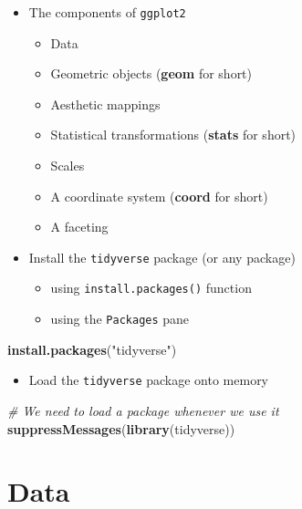 \documentclass[]{book}
\newenvironment{Shaded}{\begin{snugshade}}{\end{snugshade}}
\newcommand{\KeywordTok}[1]{\textcolor[rgb]{0.13,0.29,0.53}{\textbf{{#1}}}}
\newcommand{\StringTok}[1]{\textcolor[rgb]{0.31,0.60,0.02}{{#1}}}
\newcommand{\CommentTok}[1]{\textcolor[rgb]{0.56,0.35,0.01}{\textit{{#1}}}}
\newcommand{\NormalTok}[1]{{#1}}
\providecommand{\tightlist}{%
  \setlength{\itemsep}{0pt}\setlength{\parskip}{0pt}}
\begin{document}
\begin{itemize}
\tightlist
\item
  The components of \texttt{ggplot2}

  \begin{itemize}
  \tightlist
  \item
    Data
  \item
    Geometric objects (\textbf{geom} for short)
  \item
    Aesthetic mappings
  \item
    Statistical transformations (\textbf{stats} for short)
  \item
    Scales
  \item
    A coordinate system (\textbf{coord} for short)
  \item
    A faceting
  \end{itemize}
\item
  Install the \texttt{tidyverse} package (or any package)

  \begin{itemize}
  \tightlist
  \item
    using \texttt{install.packages()} function
  \item
    using the \texttt{Packages} pane
  \end{itemize}
\end{itemize}

\begin{Shaded}
\begin{Highlighting}[]
\KeywordTok{install.packages}\NormalTok{(}\StringTok{"tidyverse"}\NormalTok{)}
\end{Highlighting}
\end{Shaded}

\begin{itemize}
\tightlist
\item
  Load the \texttt{tidyverse} package onto memory
\end{itemize}

\begin{Shaded}
\begin{Highlighting}[]
\CommentTok{# We need to load a package whenever we use it}
\KeywordTok{suppressMessages}\NormalTok{(}\KeywordTok{library}\NormalTok{(tidyverse)) }
\end{Highlighting}
\end{Shaded}

\section{Data}\label{data}
\end{document}
